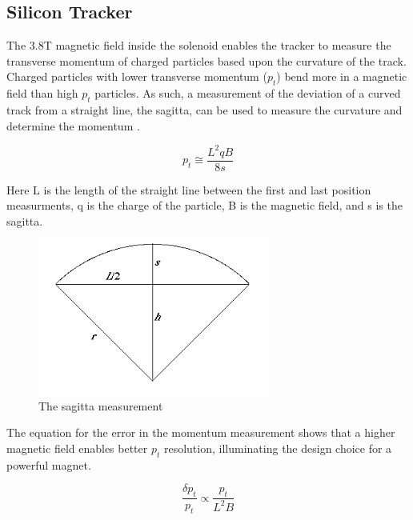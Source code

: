 \subsection{Silicon Tracker}
The 3.8T magnetic field inside the solenoid enables the tracker to measure the transverse momentum of charged particles based upon the curvature of the track. Charged particles with lower transverse momentum ($p_{t}$) bend more in a magnetic field than high $p_{t}$ particles. As such, a measurement of the deviation of a curved track from a straight line, the sagitta, can be used to measure the curvature and determine the momentum \cite{pdgreview}.

\begin{equation}
p_{t} \cong \frac{L^{2}qB}{8s}
\end{equation}

Here L is the length of the straight line between the first and last position measurments, q is the charge of the particle, B is the magnetic field, and s is the sagitta.

\begin{figure}[h!]
  \centering
  \includegraphics[width=3in]{images/sagitta.png}
  \caption
   {The sagitta measurement}
  \label{fig:sagittadrawing}
\end{figure}

The equation for the error in the momentum measurement shows that a higher magnetic field enables better $p_{t}$ resolution, illuminating the design choice for a powerful magnet.

\begin{equation}
\frac{\delta p_{t}}{p_{t}} \propto \frac{p_{t}}{L^{2}B} 
\end{equation}

